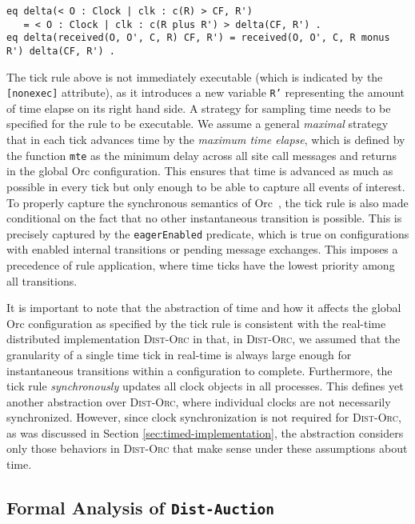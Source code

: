 \documentclass{eptcs}
\begin{document}
\begin{small}
\begin{verbatim}
eq delta(< O : Clock | clk : c(R) > CF, R') 
   = < O : Clock | clk : c(R plus R') > delta(CF, R') . 
eq delta(received(O, O', C, R) CF, R') = received(O, O', C, R monus R') delta(CF, R') .
\end{verbatim}
\end{small}

The tick rule above is not immediately executable (which is indicated by the \texttt{[nonexec]} attribute), as it introduces a new variable \texttt{R'} representing the amount of time elapse on its right hand side. A strategy for sampling time needs to be specified for the rule to be executable. We assume a general \emph{maximal} strategy that in each tick advances time by the \emph{maximum time elapse}, which is defined by the function \texttt{mte} as the minimum delay across all site call messages and returns in the global Orc configuration. This ensures that time is advanced as much as possible in every tick but only enough to be able to capture all events of interest. To properly capture the synchronous semantics of Orc~\cite{AlTurkiM07PPDP,AlTurkiM07WWV}, the tick rule is also made conditional on the fact that no other instantaneous transition is possible. This is precisely captured by the \texttt{eagerEnabled} predicate, which  is true on configurations with enabled internal transitions or pending message exchanges. This imposes a precedence of rule application, where time ticks have the lowest priority among all transitions. 


It is important to note that the abstraction of time and how it affects the global Orc configuration as specified by the tick rule is consistent with the real-time distributed implementation \textsc{Dist-Orc} in that, in \textsc{Dist-Orc}, we assumed that the granularity of a single time tick in real-time is always large enough for instantaneous transitions within a configuration to complete. Furthermore, the tick rule \emph{synchronously} updates all clock objects in all processes. This defines yet another abstraction over \textsc{Dist-Orc}, where individual clocks are not necessarily synchronized. However, since clock synchronization is not required for \textsc{Dist-Orc}, as was discussed in Section \ref{sec:timed-implementation}, the abstraction considers only those behaviors in \textsc{Dist-Orc} that make sense under these assumptions about time.




\subsection{Formal Analysis of \texttt{Dist-Auction}}
\end{document}
